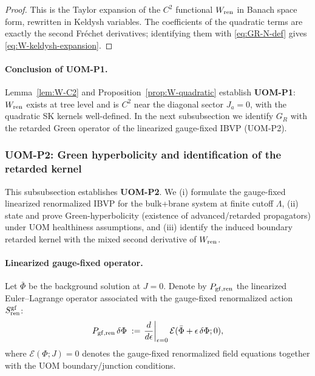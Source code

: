 \documentclass[10pt]{article}
\theoremstyle{definition}
\theoremstyle{plain}
\begin{document}
\begin{proof}
This is the Taylor expansion of the $C^2$ functional $W_{\rm ren}$ in Banach space form, rewritten in Keldysh variables.
The coefficients of the quadratic terms are exactly the second Fr\'echet derivatives; identifying them with \eqref{eq:GR-N-def} gives \eqref{eq:W-keldysh-expansion}.
\end{proof}

\paragraph{Conclusion of UOM-P1.}
Lemma~\ref{lem:W-C2} and Proposition~\ref{prop:W-quadratic} establish \textbf{UOM-P1}:
$W_{\rm ren}$ exists at tree level and is $C^2$ near the diagonal sector $J_a=0$, with the quadratic SK kernels well-defined.
In the next subsubsection we identify $G_R$ with the retarded Green operator of the linearized gauge-fixed IBVP (UOM-P2).

\subsubsection{UOM-P2: Green hyperbolicity and identification of the retarded kernel}
\label{subsubsec:uom-P2}

This subsubsection establishes \textbf{UOM-P2}.  We (i) formulate the gauge-fixed linearized renormalized IBVP
for the bulk+brane system at finite cutoff $\Lambda$, (ii) state and prove Green-hyperbolicity (existence of advanced/retarded
propagators) under UOM healthiness assumptions, and (iii) identify the induced boundary retarded kernel with the mixed
second derivative of $W_{\rm ren}$.

\paragraph{Linearized gauge-fixed operator.}
Let $\bar\Phi$ be the background solution at $J=0$.  Denote by $P_{\rm gf,ren}$ the linearized Euler--Lagrange operator
associated with the gauge-fixed renormalized action $S_{\rm ren}^{\rm gf}$:
\begin{equation}
P_{\rm gf,ren}\,\delta\Phi
\;:=
\left.\frac{d}{d\epsilon}\right|_{\epsilon=0}
\mathcal E(\bar\Phi+\epsilon\,\delta\Phi;0),
\label{eq:Pgf-def}
\end{equation}
where $\mathcal E(\Phi;J)=0$ denotes the gauge-fixed renormalized field equations together with the UOM boundary/junction conditions.
\end{document}
